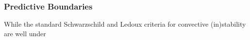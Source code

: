 {\color{brown}
\subsubsection{Predictive Boundaries}

While the standard Schwarzschild and Ledoux criteria for convective (in)stability are well under

}